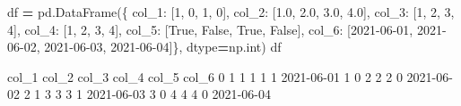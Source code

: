 \documentclass[
]{book}
\newenvironment{Shaded}{\begin{snugshade}}{\end{snugshade}}
\newcommand{\BuiltInTok}[1]{#1}
\newcommand{\DecValTok}[1]{\textcolor[rgb]{0.00,0.00,0.81}{#1}}
\newcommand{\FloatTok}[1]{\textcolor[rgb]{0.00,0.00,0.81}{#1}}
\newcommand{\NormalTok}[1]{#1}
\newcommand{\OperatorTok}[1]{\textcolor[rgb]{0.81,0.36,0.00}{\textbf{#1}}}
\newcommand{\StringTok}[1]{\textcolor[rgb]{0.31,0.60,0.02}{#1}}
\newcommand{\VariableTok}[1]{\textcolor[rgb]{0.00,0.00,0.00}{#1}}
\begin{document}
\begin{Shaded}
\begin{Highlighting}[]
\NormalTok{df }\OperatorTok{=}\NormalTok{ pd.DataFrame(\{}
                   \StringTok{\textquotesingle{}col\_1\textquotesingle{}}\NormalTok{: [}\DecValTok{1}\NormalTok{, }\DecValTok{0}\NormalTok{, }\DecValTok{1}\NormalTok{, }\DecValTok{0}\NormalTok{], }
                   \StringTok{\textquotesingle{}col\_2\textquotesingle{}}\NormalTok{: [}\FloatTok{1.0}\NormalTok{, }\FloatTok{2.0}\NormalTok{, }\FloatTok{3.0}\NormalTok{, }\FloatTok{4.0}\NormalTok{], }
                   \StringTok{\textquotesingle{}col\_3\textquotesingle{}}\NormalTok{: [}\StringTok{\textquotesingle{}1\textquotesingle{}}\NormalTok{, }\StringTok{\textquotesingle{}2\textquotesingle{}}\NormalTok{, }\StringTok{\textquotesingle{}3\textquotesingle{}}\NormalTok{, }\StringTok{\textquotesingle{}4\textquotesingle{}}\NormalTok{],}
                   \StringTok{\textquotesingle{}col\_4\textquotesingle{}}\NormalTok{: [}\StringTok{\textquotesingle{}1\textquotesingle{}}\NormalTok{, }\DecValTok{2}\NormalTok{, }\StringTok{\textquotesingle{}3\textquotesingle{}}\NormalTok{, }\DecValTok{4}\NormalTok{],}
                   \StringTok{\textquotesingle{}col\_5\textquotesingle{}}\NormalTok{: [}\VariableTok{True}\NormalTok{, }\VariableTok{False}\NormalTok{, }\VariableTok{True}\NormalTok{, }\VariableTok{False}\NormalTok{],}
                   \StringTok{\textquotesingle{}col\_6\textquotesingle{}}\NormalTok{: [}\StringTok{\textquotesingle{}2021{-}06{-}01\textquotesingle{}}\NormalTok{, }\StringTok{\textquotesingle{}2021{-}06{-}02\textquotesingle{}}\NormalTok{, }\StringTok{\textquotesingle{}2021{-}06{-}03\textquotesingle{}}\NormalTok{, }\StringTok{\textquotesingle{}2021{-}06{-}04\textquotesingle{}}\NormalTok{]\},}
\NormalTok{                   dtype}\OperatorTok{=}\NormalTok{np.}\BuiltInTok{int}\NormalTok{)}
\NormalTok{df}
\end{Highlighting}
\end{Shaded}

\begin{Shaded}
\begin{Highlighting}[]
\NormalTok{   col\_1  col\_2  col\_3  col\_4  col\_5       col\_6}
\NormalTok{0      1      1      1      1      1  2021{-}06{-}01}
\NormalTok{1      0      2      2      2      0  2021{-}06{-}02}
\NormalTok{2      1      3      3      3      1  2021{-}06{-}03}
\NormalTok{3      0      4      4      4      0  2021{-}06{-}04}
\end{Highlighting}
\end{Shaded}
\end{document}
